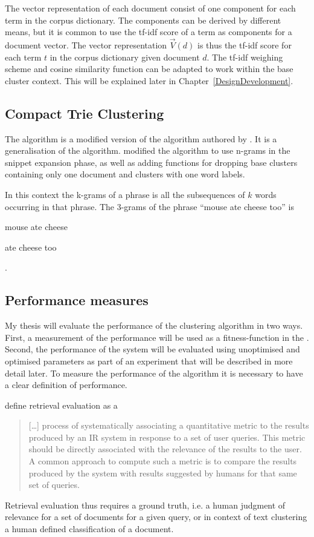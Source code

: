 The vector representation of each document consist of one component for each term in the corpus dictionary. The components can be derived by different means, but it is common to use the tf-idf score of a term as components for a document vector. The vector representation \(\vec{V}(d)\) is thus the tf-idf score for each term \(t\) in the corpus dictionary given document \(d\). The tf-idf weighing scheme and cosine similarity function can be adapted to work within the base cluster context. This will be explained later in Chapter~\ref{DesignDevelopment}.

\subsection{Compact Trie Clustering}
The \CTC algorithm is a modified version of the \STC algorithm authored by \cite{Moe2014}. It is a generalisation of the \STC algorithm. \cite{Moe2014} modified the algorithm to use n-grams in the snippet expansion phase, as well as adding functions for dropping base clusters containing only one document and clusters with one word labels.

 In this context the k-grams of a phrase is all the subsequences of \(k\) words occurring in that phrase. The 3-grams of the phrase ``mouse ate cheese too'' is
\begin{inparaenum}[(1)] 
    \item mouse ate cheese
    \item ate cheese too
\end{inparaenum}.

\subsection{Performance measures}
My thesis will evaluate the performance of the clustering algorithm in two ways. First, a measurement of the performance will be used as a fitness-function in the \GA. Second, the performance of the system will be evaluated using unoptimised and optimised parameters as part of an experiment that will be described in more detail later. To measure the performance of the \CTC algorithm it is necessary to have a clear definition of performance.

\cite[][131]{Baeza-Yates2011b} define retrieval evaluation as a \begin{quote} 
[\dots] process of systematically associating a quantitative metric to the results produced by an IR system in response to a set of user queries. This metric should be directly associated with the relevance of the results to the user. A common approach to compute such a metric is to compare the results produced by the system with results suggested by humans for that same set of queries.
\end{quote}
Retrieval evaluation thus requires a ground truth, i.e. a human judgment of relevance for a set of documents for a given query, or in context of text clustering a human defined classification of a document.

